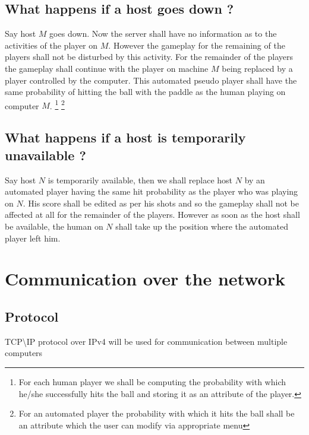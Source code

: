   \subsection{What happens if a host goes down ?}
  Say host $ M $ goes down.  Now the server shall have no information as to the activities of the player  on $ M $.  However the gameplay for the remaining of the players shall not be disturbed  by this activity.  For the remainder of the players the gameplay shall continue with the player
  on machine $ M $ being replaced by a player controlled by the computer. This automated pseudo player shall have the same probability of hitting the  ball with the paddle as the human playing on computer $M$. 
  \footnote { For each human player we shall be computing the probability with which he/she successfully hits the ball and storing it as an attribute of the player.}
  \footnote{For an automated player the probability with which it hits the ball shall be   an attribute which the user can modify via appropriate menu}
  \subsection{What happens if a host is temporarily unavailable ?}
  Say host $N$ is temporarily available,  then we shall replace host $N$ by an automated player having the same hit  probability as the player who was playing on $N$.  His score shall be edited as per his shots and so the gameplay shall not be  affected at all for the remainder of the players.
  However as soon as the host shall be available,  the human on $N$ shall take up the position where the automated player left  him. 
  \pagebreak 
  \section{Communication over the network}
  \subsection{Protocol}
TCP\textbackslash IP protocol over IPv4 will be used for communication between multiple computers
